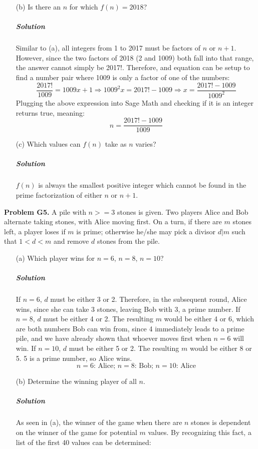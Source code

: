 \documentclass[a4paper]{amsart}
\begin{document}
\begin{flushleft}
\begin{enumerate}
			\item[(b)] Is there an $n$ for which $f(n)=2018$?
			
			\subparagraph{\textit{Solution}} Similar to (a), all integers from 1 to 2017 must be factors of $n$ or $n+1$. However, since the two factors of 2018 (2 and 1009) both fall into that range, the answer cannot simply be 2017!. Therefore, and equation can be setup to find a number pair where 1009 is only a factor of one of the numbers:
			\[ \frac{2017!}{1009}=1009x+1\Rightarrow 1009^2x=2017!-1009\Rightarrow x=\frac{2017!-1009}{1009^2} \]
			Plugging the above expression into Sage Math and checking if it is an integer returns true, meaning:
			\[ n=\frac{2017!-1009}{1009} \]
			
			\item[(c)] Which values can $f(n)$ take as $n$ varies?
			
			\subparagraph{\textit{Solution}} $f(n)$ is always the smallest positive integer which cannot be found in the prime factorization of either $n$ or $n+1$.
		\end{enumerate}
	
		\textbf{Problem G5.} A pile with $n>=3$ stones is given. Two players Alice and Bob alternate taking stones, with Alice moving first. On a turn, if there are $m$ stones left, a player loses if $m$ is prime; otherwise he/she may pick a divisor $d | m$ such that $1<d<m$ and remove $d$ stones from the pile.
		
		\begin{enumerate}
			\item[(a)] Which player wins for $n=6$, $n=8$, $n=10$?
			
			\subparagraph{\textit{Solution}} If $n=6$, $d$ must be either 3 or 2. Therefore, in the subsequent round, Alice wins, since she can take 3 stones, leaving Bob with 3, a prime number. If $n=8$, $d$ must be either 4 or 2. The resulting $m$ would be either 4 or 6, which are both numbers Bob can win from, since 4 immediately leads to a prime pile, and we have already shown that whoever moves first when $n=6$ will win. If $n=10$, $d$ must be either 5 or 2. The resulting $m$ would be either 8 or 5. 5 is a prime number, so Alice wins.
			\[ \text{$n=6$: Alice; $n=8$: Bob; $n=10$: Alice} \]
			
			\item[(b)] Determine the winning player of all $n$.
			
			\subparagraph{\textit{Solution}} As seen in (a), the winner of the game when there are $n$ stones is dependent on the winner of the game for potential $m$ values. By recognizing this fact, a list of the first 40 values can be determined:
			

\end{enumerate}
\end{flushleft}
\end{document}
